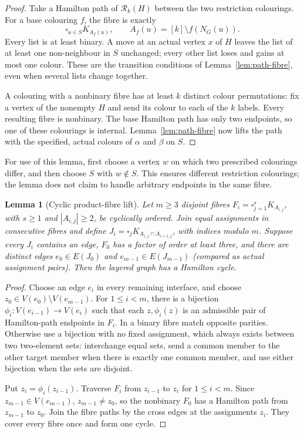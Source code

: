 \documentclass[11pt]{article}
\newtheorem{lemma}[theorem]{Lemma}
\theoremstyle{remark}
\newcommand{\Rk}{\mathcal R_k}
\numberwithin{equation}{section}
\begin{document}
\begin{proof}
Take a Hamilton path of $\Rk(H)$ between the two restriction
colourings.  For a base colouring $f$, the fibre is exactly
\[
 \square_{u\in S}K_{A_f(u)},\qquad
 A_f(u)=[k]\setminus f(N_G(u)).
\]
Every list is at least binary.  A move at an actual vertex $x$ of $H$
leaves the list of at least one non-neighbour in $S$ unchanged; every
other list loses and gains at most one colour.  These are the transition
conditions of Lemma~\ref{lem:path-fibre}, even when several lists
change together.

A colouring with a nonbinary fibre has at least $k$ distinct colour
permutations: fix a vertex of the nonempty $H$ and send its colour to
each of the $k$ labels.  Every resulting fibre is nonbinary.  The base
Hamilton path has only two endpoints, so one of these colourings is
internal.  Lemma~\ref{lem:path-fibre} now lifts the path with the
specified, actual colours of $\alpha$ and $\beta$ on $S$.
\end{proof}

For use of this lemma, first choose a vertex $w$ on which two prescribed
colourings differ, and then choose $S$ with $w\notin S$.  This ensures
different restriction colourings; the lemma does not claim to handle
arbitrary endpoints in the same fibre.

\begin{lemma}[Cyclic product-fibre lift]
\label{lem:fibre-lift}
Let $m\ge3$ disjoint fibres
$F_i=\square_{j=1}^sK_{A_{i,j}}$, with $s\ge1$ and
$|A_{i,j}|\ge2$, be cyclically ordered.  Join equal assignments in
consecutive fibres and define
$J_i=\square_j K_{A_{i,j}\cap A_{i+1,j}}$, with indices modulo $m$.
Suppose every $J_i$ contains an edge, $F_0$ has a factor of order at
least three, and there are distinct edges
$e_0\in E(J_0)$ and $e_{m-1}\in E(J_{m-1})$ (compared as actual
assignment pairs).  Then the layered graph has a Hamilton cycle.
\end{lemma}

\begin{proof}
Choose an edge $e_i$ in every remaining interface, and choose
$z_0\in V(e_0)\setminus V(e_{m-1})$.  For $1\le i<m$, there is a
bijection $\phi_i:V(e_{i-1})\to V(e_i)$ such that each
$z,\phi_i(z)$ is an admissible pair of Hamilton-path endpoints in
$F_i$.  In a binary fibre match opposite parities.  Otherwise use a
bijection with no fixed assignment, which always exists between two
two-element sets: interchange equal sets, send a common member to the
other target member when there is exactly one common member, and use
either bijection when the sets are disjoint.

Put $z_i=\phi_i(z_{i-1})$.  Traverse $F_i$ from $z_{i-1}$ to $z_i$
for $1\le i<m$.  Since $z_{m-1}\in V(e_{m-1})$,
$z_{m-1}\ne z_0$, so the nonbinary $F_0$ has a Hamilton path from
$z_{m-1}$ to $z_0$.  Join the fibre paths by the cross edges at the
assignments $z_i$.  They cover every fibre once and form one cycle.
\end{proof}
\end{document}
